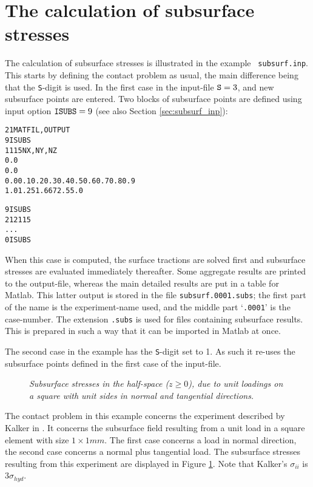 \documentclass[12pt]{report}
\begin{document}
\section{The calculation of subsurface stresses}
\label{sec:ex_subsurf}

The calculation of subsurface stresses is illustrated in the example {\tt
subsurf.inp}. This starts by defining the contact problem as usual, the
main difference being that the {\tt S}-digit is used. In the first case in
the input-file ${\tt S}=3$, and new subsurface points are entered. Two
blocks of subsurface points are defined using input option ${\tt
ISUBS}=9$ (see also Section \ref{sec:subsurf_inp}):
\begin{alltt}\small
% subsurface points:
   2   1        MATFIL, OUTPUT
% first block of subsurface points:
   9            ISUBS
   1   1   15   NX, NY, NZ
% points x:
   0.0
% points y:
   0.0
% points z:
   0.0   0.1   0.2    0.3   0.4   0.5   0.6   0.7   0.8   0.9
   1.0   1.25  1.667  2.5   5.0

% second block of subsurface points:
   9            ISUBS
  21   21   15   % NX, NY, NZ
   ...
  0             ISUBS
\end{alltt}
When this case is computed, the surface tractions are solved first
and subsurface stresses are evaluated immediately thereafter. Some
aggregate results are printed to the output-file, whereas the main
detailed results are put in a table for Matlab. This latter output
is stored in the file {\tt subsurf.0001\-.subs}; the first part of the
name is the experiment-name used, and the middle part `{\tt .0001}' is
the case-number. The extension {\tt .subs} is used for files containing
subsurface results. This is prepared in such a way that it can be
imported in Matlab at once.

The second case in the example has the {\tt S}-digit set to 1. As such it
re-uses the subsurface points defined in the first case of the
input-file.

\begin{figure}[bt]
\centering
{}
\caption{\em Subsurface stresses in the half-space ($z\ge 0$), due to unit
loadings on a square with unit sides in normal and tangential directions.}
\label{fig:subsurf1}
\end{figure}

The contact problem in this example concerns the experiment described by
Kalker in \cite[paragraph 5.2.2.4]{Kalker1990}. It concerns the subsurface
field resulting from a unit load in a square element with size $1\times
1\unit{mm}$. The first case concerns a load in normal direction, the second case
concerns a normal plus tangential load. The subsurface stresses resulting
from this experiment are displayed in Figure \ref{fig:subsurf1}. Note that
Kalker's $\sigma_{ii}$ is $3\sigma_{hyd}$. 
\end{document}
